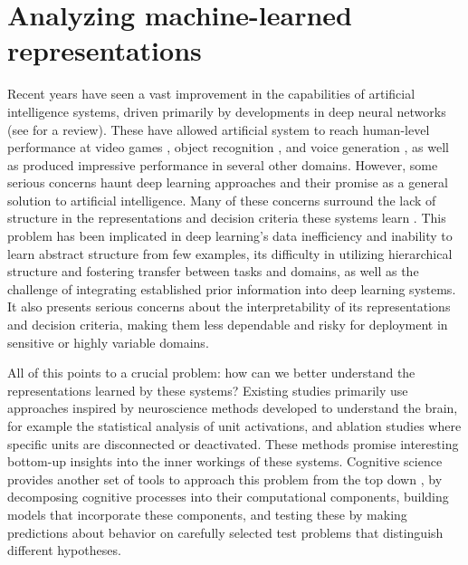 \section{Analyzing machine-learned representations}

Recent years have seen a vast improvement in the capabilities of artificial intelligence systems, driven primarily by developments in deep neural networks (see \citet{lecun2015deep} for a review). These have allowed artificial system to reach human-level performance at video games \citep{mnih2015human}, object recognition \citep{russakovsky2015imagenet}, and voice generation \citep{oord2016wavenet}, as well as produced impressive performance in several other domains. However, some serious concerns haunt deep learning approaches and their promise as a general solution to artificial intelligence. Many of these concerns surround the lack of structure in the representations and decision criteria these systems learn \citep{marcus2018deep,lake18}. This problem has been implicated in deep learning's data inefficiency and inability to learn abstract structure from few examples, its difficulty in utilizing hierarchical structure and fostering transfer between tasks and domains, as well as the challenge of integrating established prior information into deep learning systems. It also presents serious concerns about the interpretability of its representations and decision criteria, making them less dependable and risky for deployment in sensitive or highly variable domains. 

All of this points to a crucial problem: how can we better understand the representations learned by these systems? Existing studies \citep[e.g.,][]{karpathy2015visualizing, li2015visualizing, yosinski2015understanding, zeiler2014visualizing} primarily use approaches inspired by neuroscience methods developed to understand the brain, for example the statistical analysis of unit activations, and ablation studies where specific units are disconnected or deactivated. These methods promise interesting bottom-up insights into the inner workings of these systems. Cognitive science provides another set of tools to approach this problem from the top down \citep{ritter17, kadar2017representation, mccoy2019right}, by decomposing cognitive processes into their computational components, building models that incorporate these components, and testing these by making predictions about behavior on carefully selected test problems that distinguish different hypotheses. 

